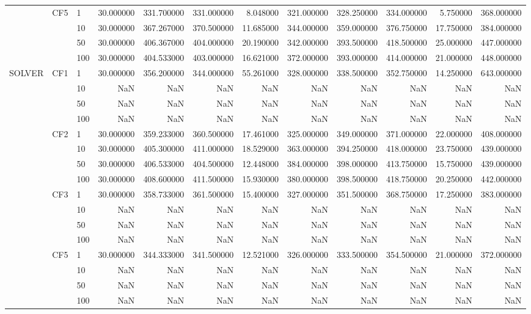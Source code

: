 \begin{tabular}{lllrrrrrrrrr}
\cline{2-12}
 & \multirow[t]{4}{*}{CF5} & 1 & 30.000000 & 331.700000 & 331.000000 & 8.048000 & 321.000000 & 328.250000 & 334.000000 & 5.750000 & 368.000000 \\
 &  & 10 & 30.000000 & 367.267000 & 370.500000 & 11.685000 & 344.000000 & 359.000000 & 376.750000 & 17.750000 & 384.000000 \\
 &  & 50 & 30.000000 & 406.367000 & 404.000000 & 20.190000 & 342.000000 & 393.500000 & 418.500000 & 25.000000 & 447.000000 \\
 &  & 100 & 30.000000 & 404.533000 & 403.000000 & 16.621000 & 372.000000 & 393.000000 & 414.000000 & 21.000000 & 448.000000 \\
\cline{1-12} \cline{2-12}
\multirow[t]{16}{*}{SOLVER} & \multirow[t]{4}{*}{CF1} & 1 & 30.000000 & 356.200000 & 344.000000 & 55.261000 & 328.000000 & 338.500000 & 352.750000 & 14.250000 & 643.000000 \\
 &  & 10 & NaN & NaN & NaN & NaN & NaN & NaN & NaN & NaN & NaN \\
 &  & 50 & NaN & NaN & NaN & NaN & NaN & NaN & NaN & NaN & NaN \\
 &  & 100 & NaN & NaN & NaN & NaN & NaN & NaN & NaN & NaN & NaN \\
\cline{2-12}
 & \multirow[t]{4}{*}{CF2} & 1 & 30.000000 & 359.233000 & 360.500000 & 17.461000 & 325.000000 & 349.000000 & 371.000000 & 22.000000 & 408.000000 \\
 &  & 10 & 30.000000 & 405.300000 & 411.000000 & 18.529000 & 363.000000 & 394.250000 & 418.000000 & 23.750000 & 439.000000 \\
 &  & 50 & 30.000000 & 406.533000 & 404.500000 & 12.448000 & 384.000000 & 398.000000 & 413.750000 & 15.750000 & 439.000000 \\
 &  & 100 & 30.000000 & 408.600000 & 411.500000 & 15.930000 & 380.000000 & 398.500000 & 418.750000 & 20.250000 & 442.000000 \\
\cline{2-12}
 & \multirow[t]{4}{*}{CF3} & 1 & 30.000000 & 358.733000 & 361.500000 & 15.400000 & 327.000000 & 351.500000 & 368.750000 & 17.250000 & 383.000000 \\
 &  & 10 & NaN & NaN & NaN & NaN & NaN & NaN & NaN & NaN & NaN \\
 &  & 50 & NaN & NaN & NaN & NaN & NaN & NaN & NaN & NaN & NaN \\
 &  & 100 & NaN & NaN & NaN & NaN & NaN & NaN & NaN & NaN & NaN \\
\cline{2-12}
 & \multirow[t]{4}{*}{CF5} & 1 & 30.000000 & 344.333000 & 341.500000 & 12.521000 & 326.000000 & 333.500000 & 354.500000 & 21.000000 & 372.000000 \\
 &  & 10 & NaN & NaN & NaN & NaN & NaN & NaN & NaN & NaN & NaN \\
 &  & 50 & NaN & NaN & NaN & NaN & NaN & NaN & NaN & NaN & NaN \\
 &  & 100 & NaN & NaN & NaN & NaN & NaN & NaN & NaN & NaN & NaN \\
\cline{1-12} \cline{2-12}
\bottomrule
\end{tabular}
